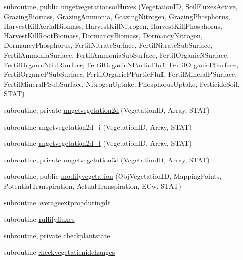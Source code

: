 \begin{DoxyCompactItemize}
\item 
subroutine, public \mbox{\hyperlink{namespacemodulevegetation_a96e88e3033a51f7458b1307ffccc0e3a}{ungetvegetationsoilfluxes}} (Vegetation\+ID, Soil\+Fluxes\+Active, Grazing\+Biomass, Grazing\+Ammonia, Grazing\+Nitrogen, Grazing\+Phosphorus, Harvest\+Kill\+Aerial\+Biomass, Harvest\+Kill\+Nitrogen, Harvest\+Kill\+Phosphorus, Harvest\+Kill\+Root\+Biomass, Dormancy\+Biomass, Dormancy\+Nitrogen, Dormancy\+Phosphorus, Fertil\+Nitrate\+Surface, Fertil\+Nitrate\+Sub\+Surface, Fertil\+Ammonia\+Surface, Fertil\+Ammonia\+Sub\+Surface, Fertil\+Organic\+N\+Surface, Fertil\+Organic\+N\+Sub\+Surface, Fertil\+Organic\+N\+Partic\+Fluff, Fertil\+Organic\+P\+Surface, Fertil\+Organic\+P\+Sub\+Surface, Fertil\+Organic\+P\+Partic\+Fluff, Fertil\+Mineral\+P\+Surface, Fertil\+Mineral\+P\+Sub\+Surface, Nitrogen\+Uptake, Phosphorus\+Uptake, Pesticide\+Soil, S\+T\+AT)
\item 
subroutine, private \mbox{\hyperlink{namespacemodulevegetation_a2ffe279db4531dedb2c50c6349246a00}{ungetvegetation2d}} (Vegetation\+ID, Array, S\+T\+AT)
\item 
subroutine \mbox{\hyperlink{namespacemodulevegetation_a51242f691596a8990eaffb93f189b5ab}{ungetvegetation2d\+\_\+i}} (Vegetation\+ID, Array, S\+T\+AT)
\item 
subroutine \mbox{\hyperlink{namespacemodulevegetation_ae3b94dadad52bcad92f73e4358946cda}{ungetvegetation2d\+\_\+l}} (Vegetation\+ID, Array, S\+T\+AT)
\item 
subroutine, private \mbox{\hyperlink{namespacemodulevegetation_a1908216b2236c50cd95129a3757c0ebd}{ungetvegetation3d}} (Vegetation\+ID, Array, S\+T\+AT)
\item 
subroutine, public \mbox{\hyperlink{namespacemodulevegetation_ada29538c07fc35e07aff7961509fee8d}{modifyvegetation}} (Obj\+Vegetation\+ID, Mapping\+Points, Potential\+Transpiration, Actual\+Transpiration, E\+Cw, S\+T\+AT)
\item 
subroutine \mbox{\hyperlink{namespacemodulevegetation_a7f06e4e44dcbf158ef41eaf0b26ef491}{averageextpropduringdt}}
\item 
subroutine \mbox{\hyperlink{namespacemodulevegetation_a902f9aa035167e92ff669898d4bb5c14}{nullifyfluxes}}
\item 
subroutine, private \mbox{\hyperlink{namespacemodulevegetation_a37069c3859e6dc1812ad2ddda5ab49cd}{checkplantstate}}
\item 
subroutine \mbox{\hyperlink{namespacemodulevegetation_af6b014e82fcb0998befe6b8a12f66de3}{checkvegetationidchanges}}
\item 

\end{DoxyCompactItemize}
